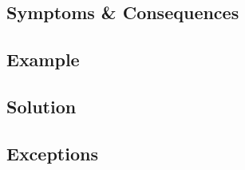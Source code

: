 \subsection{Symptoms \& Consequences}

\subsection{Example}

\subsection{Solution}

\subsection{Exceptions}